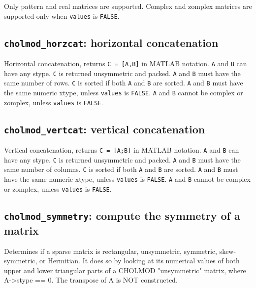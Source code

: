 \documentclass[11pt]{article}
\begin{document}
Only pattern and real matrices are supported.  Complex and zomplex matrices
are supported only when {\tt values} is {\tt FALSE}.

\newpage \subsection{{\tt cholmod\_horzcat}: horizontal concatenation}


Horizontal concatenation, returns {\tt C = [A,B]} in MATLAB notation.
{\tt A} and {\tt B} can have any stype.  {\tt C} is returned unsymmetric and packed.
{\tt A} and {\tt B} must have the same number of rows.
{\tt C} is sorted if both {\tt A} and {\tt B} are sorted.
{\tt A} and {\tt B} must have the same numeric xtype, unless {\tt values} is {\tt FALSE}.
{\tt A} and {\tt B} cannot be complex or zomplex, unless {\tt values} is {\tt FALSE}.

\subsection{{\tt cholmod\_vertcat}: vertical concatenation}


Vertical concatenation, returns {\tt C = [A;B]} in MATLAB notation.
{\tt A} and {\tt B} can have any stype.  {\tt C} is returned unsymmetric and packed.
{\tt A} and {\tt B} must have the same number of columns.
{\tt C} is sorted if both {\tt A} and {\tt B} are sorted.
{\tt A} and {\tt B} must have the same numeric xtype, unless {\tt values} is {\tt FALSE}.
{\tt A} and {\tt B} cannot be complex or zomplex, unless {\tt values} is {\tt FALSE}.

\newpage \subsection{{\tt cholmod\_symmetry}: compute the symmetry of a matrix}



Determines if a sparse matrix is rectangular, unsymmetric, symmetric,
skew-symmetric, or Hermitian.  It does so by looking at its numerical values
of both upper and lower triangular parts of a CHOLMOD "unsymmetric"
matrix, where A->stype == 0.  The transpose of A is NOT constructed.
\end{document}
